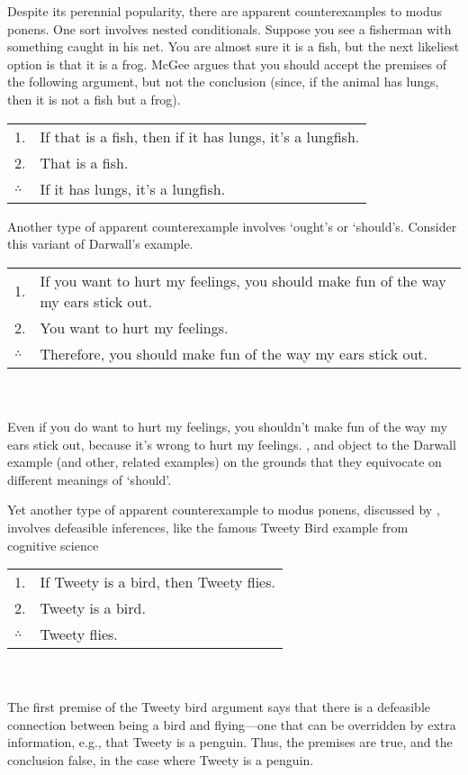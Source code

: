 Despite its perennial popularity, there are apparent counterexamples to modus ponens.  One sort \citep{mcgee:mp} involves nested conditionals.  Suppose you see a fisherman with something caught in his net.  You are almost sure it is a fish, but the next likeliest option is that it is a frog.  McGee argues that you should accept the premises of the following argument, but not the conclusion (since, if the animal has lungs, then it is not a fish but a frog).\smallskip\\
\begin{tabular}{ll}
1. & If that is a fish, then if it has lungs, it's a lungfish.\\
2. & That is a fish.\\
\hline
$\therefore$ & If it has lungs, it's a lungfish.
\end{tabular}

\medskip

Another type of apparent counterexample \citep{kolodny-macfarlane, Darwall1983-DARIR} involves `ought's or `should's.  Consider this variant of Darwall's example.\smallskip\\
\begin{tabular}{p{}p{}}
1. & If you want to hurt my feelings, you should make fun of the way my ears stick out.\\
2. & You want to hurt my feelings.\\
\hline
$\therefore$ & Therefore, you should make fun of the way my ears stick out.
\end{tabular}\\\smallskip\\
Even if you do want to hurt my feelings, you shouldn't make fun of the way my ears stick out, because it's wrong to hurt my feelings.  \citet{DowellJL2011-DOWAFC-2}, and \citet{Lauer2014-LAUPND} object to the Darwall example (and other, related examples) on the grounds that they equivocate on different meanings of `should'.

Yet another type of apparent counterexample to modus ponens, discussed by \citet{walton-mp}, involves defeasible inferences, like the famous Tweety Bird example from cognitive science \citep{brewka-tweety}\smallskip\\
\begin{tabular}{ll}
1. & If Tweety is a bird, then Tweety flies.\\
2. & Tweety is a bird.\\
\hline
$\therefore$ & Tweety flies.
\end{tabular}\\\smallskip\\
The first premise of the Tweety bird argument says that there is a defeasible connection between being a bird and flying---one that can be overridden by extra information, e.g., that Tweety is a penguin.  Thus, the premises are true, and the conclusion false, in the case where Tweety is a penguin.

